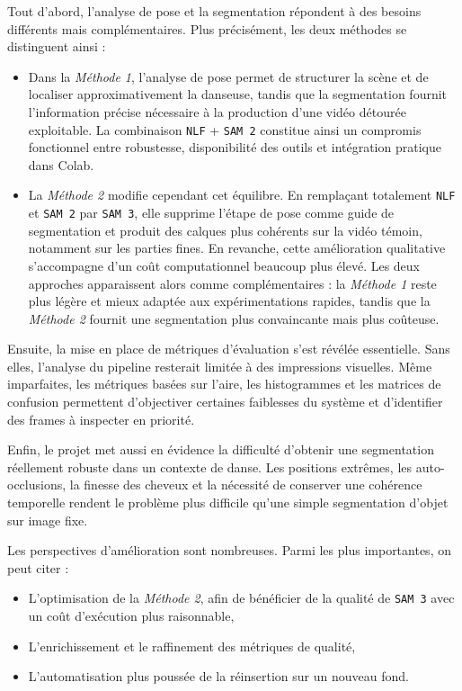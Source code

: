 \documentclass[11pt,a4paper]{article}
\begin{document}
Tout d'abord, l'analyse de pose et la segmentation répondent à des besoins différents mais complémentaires.
Plus précisément, les deux méthodes se distinguent ainsi :
\begin{itemize}
    \item Dans la \textit{Méthode 1}, l'analyse de pose permet de structurer la scène et de localiser approximativement la danseuse, tandis que la segmentation fournit l'information précise nécessaire à la production d'une vidéo détourée exploitable.
          La combinaison \texttt{NLF} + \texttt{SAM 2} constitue ainsi un compromis fonctionnel entre robustesse, disponibilité des outils et intégration pratique dans Colab.
    \item La \textit{Méthode 2} modifie cependant cet équilibre.
          En remplaçant totalement \texttt{NLF} et \texttt{SAM 2} par \texttt{SAM 3}, elle supprime l'étape de pose comme guide de segmentation et produit des calques plus cohérents sur la vidéo témoin, notamment sur les parties fines.
          En revanche, cette amélioration qualitative s'accompagne d'un coût computationnel beaucoup plus élevé. Les deux approches apparaissent alors comme complémentaires : la \textit{Méthode 1} reste plus légère et mieux adaptée aux expérimentations rapides, tandis que la \textit{Méthode 2} fournit une segmentation plus convaincante mais plus coûteuse.
\end{itemize}

Ensuite, la mise en place de métriques d'évaluation s'est révélée essentielle.
Sans elles, l'analyse du pipeline resterait limitée à des impressions visuelles.
Même imparfaites, les métriques basées sur l'aire, les histogrammes et les matrices de confusion permettent d'objectiver certaines faiblesses du système et d'identifier des frames à inspecter en priorité.

Enfin, le projet met aussi en évidence la difficulté d'obtenir une segmentation réellement robuste dans un contexte de danse.
Les positions extrêmes, les auto-occlusions, la finesse des cheveux et la nécessité de conserver une cohérence temporelle rendent le problème plus difficile qu'une simple segmentation d'objet sur image fixe.

\vspace{1cm}

Les perspectives d'amélioration sont nombreuses.
Parmi les plus importantes, on peut citer :
\begin{itemize}
    \item L'optimisation de la \textit{Méthode 2}, afin de bénéficier de la qualité de \texttt{SAM 3} avec un coût d'exécution plus raisonnable,
    \item L'enrichissement et le raffinement des métriques de qualité,
    \item L'automatisation plus poussée de la réinsertion sur un nouveau fond.
\end{itemize}
\end{document}
